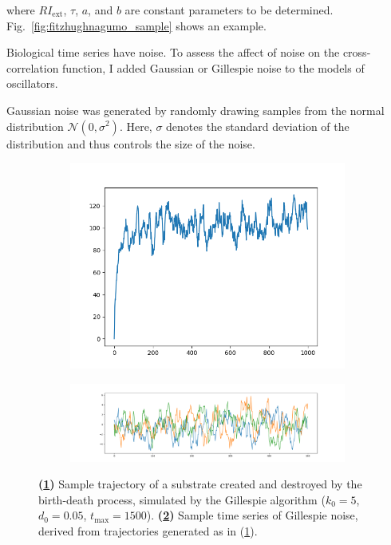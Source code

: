 where $RI_{\mathrm{ext}}$, $\tau$, $a$, and $b$ are constant parameters to be determined.
Fig.\ \ref{fig:fitzhughnagumo_sample} shows an example.


Biological time series have noise.
To assess the affect of noise on the cross-correlation function, I added Gaussian or Gillespie noise to the models of oscillators.

Gaussian noise was generated by randomly drawing samples from the normal distribution $\mathcal{N}(0,\sigma^{2})$.
Here, $\sigma$ denotes the standard deviation of the distribution and thus controls the size of the noise.


\begin{figure}
  \centering
  \begin{subfigure}{0.4\textwidth}
    \centering
    \includegraphics[width=\linewidth]{gillespie}
    \caption{
    }
    \label{fig:gillespie_trajectory}
  \end{subfigure}%
 \begin{subfigure}{0.6\textwidth}
    \centering
    \includegraphics[width=\linewidth]{gillespie_noise_samples}
    \caption{
    }
    \label{fig:gillespie_noise_samples}
  \end{subfigure}

  \caption{
    \textbf{(\ref{fig:gillespie_trajectory})}
    Sample trajectory of a substrate created and destroyed by the birth-death process, simulated by the Gillespie algorithm ($k_{0} = 5$, $d_{0} = 0.05$, $t_{\mathrm{max}} = 1500$).
    \textbf{(\ref{fig:gillespie_noise_samples})}
    Sample time series of Gillespie noise, derived from trajectories generated as in (\ref{fig:gillespie_trajectory}).
  }
  \label{fig:gillespie_noise}
\end{figure}

